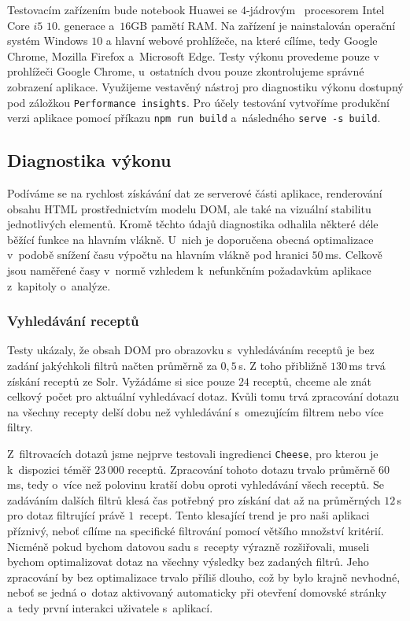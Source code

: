 Testovacím zařízením bude notebook Huawei se $4$-jádrovým ~procesorem Intel Core $i5$ $10$. generace a~$16$GB pamětí RAM. Na zařízení je nainstalován operační systém Windows $10$ a hlavní webové prohlížeče, na které cílíme, tedy Google Chrome, Mozilla Firefox a~Microsoft Edge. Testy výkonu provedeme pouze v prohlížeči Google Chrome, u~ostatních dvou pouze zkontrolujeme správné zobrazení aplikace. Využijeme vestavěný nástroj pro diagnostiku výkonu dostupný pod záložkou \texttt{Performance insights}. Pro účely testování vytvoříme produkční verzi aplikace pomocí příkazu \texttt{npm\,run\,build} a~následného \texttt{serve\,-s\,build}.

\subsection{Diagnostika výkonu}

Podíváme se na rychlost získávání dat ze serverové části aplikace, renderování obsahu HTML prostřednictvím modelu DOM, ale také na vizuální stabilitu jednotlivých elementů. Kromě těchto údajů diagnostika odhalila některé déle běžící funkce na hlavním vlákně. U~nich je doporučena obecná optimalizace v~podobě snížení času výpočtu na hlavním vlákně pod hranici $50\,$ms. Celkově jsou naměřené časy v~normě vzhledem k~nefunkčním požadavkům aplikace z~kapitoly o~analýze.

\subsubsection{Vyhledávání receptů}

Testy ukázaly, že obsah DOM pro obrazovku s~vyhledáváním receptů je bez zadání jakýchkoli filtrů načten průměrně za $0,5\,$s. Z toho přibližně $130\,$ms trvá získání receptů ze Solr. Vyžádáme si sice pouze $24$ receptů, chceme ale znát celkový počet pro aktuální vyhledávací dotaz. Kvůli tomu trvá zpracování dotazu na všechny recepty delší dobu než vyhledávání s~omezujícím filtrem nebo více filtry.

Z~filtrovacích dotazů jsme nejprve testovali ingredienci \texttt{Cheese}, pro kterou je k~dispozici téměř $23\,000$ receptů. Zpracování tohoto dotazu trvalo průměrně $60\,$ms, tedy o~více než polovinu kratší dobu oproti vyhledávání všech receptů. Se zadáváním dalších filtrů klesá čas potřebný pro získání dat až na průměrných $12\,$s pro dotaz filtrující právě $1$~recept. Tento klesající trend je pro naši aplikaci příznivý, neboť cílíme na specifické filtrování pomocí většího množství kritérií. Nicméně pokud bychom datovou sadu s~recepty výrazně rozšiřovali, museli bychom optimalizovat dotaz na všechny výsledky bez zadaných filtrů. Jeho zpracování by bez optimalizace trvalo příliš dlouho, což by bylo krajně nevhodné, neboť se jedná o~dotaz aktivovaný automaticky při otevření domovské stránky a~tedy první interakci uživatele s~aplikací.

